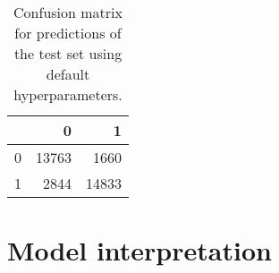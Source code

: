 \documentclass{article}
\begin{document}
\begin{itemize}
\begin{table}[h!]
\centering
\begin{tabular}{lrr}
\toprule
{} &      0 &      1 \\
\midrule
0 &  13763 &   1660 \\
1 &   2844 &  14833 \\
\bottomrule
\end{tabular}
\caption{Confusion matrix for predictions of the test set using default hyperparameters.}
\label{table:model_te_cm}
\end{table}

\end{itemize}

\section{Model interpretation}
\label{sec:interp}
\end{document}
